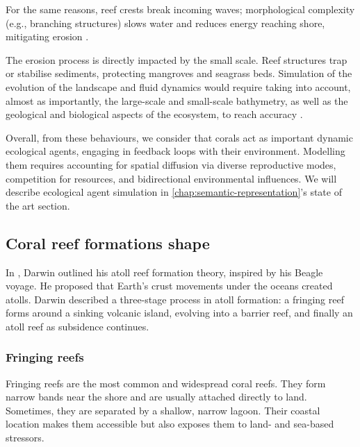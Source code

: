 For the same reasons, reef crests break incoming waves; morphological complexity (e.g., branching structures) slows water and reduces energy reaching shore, mitigating erosion \cite{Woodroffe2003}.

The erosion process is directly impacted by the small scale. Reef structures trap or stabilise sediments, protecting mangroves and seagrass beds. Simulation of the evolution of the landscape and fluid dynamics would require taking into account, almost as importantly, the large-scale and small-scale bathymetry, as well as the geological and biological aspects of the ecosystem, to reach accuracy \cite{Chevalier2017,Chevalier2015a}.


Overall, from these behaviours, we consider that corals act as important dynamic ecological agents, engaging in feedback loops with their environment. Modelling them requires accounting for spatial diffusion via diverse reproductive modes, competition for resources, and bidirectional environmental influences. We will describe ecological agent simulation in \cref{chap:semantic-representation}'s state of the art section. %


\subsection{Coral reef formations shape}
In \cite{Darwin1842}, Darwin outlined his atoll reef formation theory, inspired by his Beagle voyage. He proposed that Earth's crust movements under the oceans created atolls. Darwin described a three-stage process in atoll formation: a fringing reef forms around a sinking volcanic island, evolving into a barrier reef, and finally an atoll reef as subsidence continues.

\subsubsection{Fringing reefs}
Fringing reefs are the most common and widespread coral reefs. They form narrow bands near the shore and are usually attached directly to land. Sometimes, they are separated by a shallow, narrow lagoon. Their coastal location makes them accessible but also exposes them to land- and sea-based stressors.


